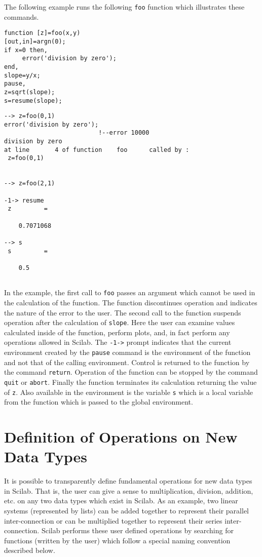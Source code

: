 The following example runs the following {\tt foo} function which
illustrates these commands.
\begin{verbatim}
function [z]=foo(x,y)
[out,in]=argn(0);
if x=0 then,
     error('division by zero');
end,
slope=y/x;
pause,
z=sqrt(slope);
s=resume(slope);
\end{verbatim}
\begin{verbatim} 
--> z=foo(0,1)
error('division by zero');
                          !--error 10000 
division by zero                                                                
at line       4 of function    foo      called by :  
 z=foo(0,1)
 
 
--> z=foo(2,1)
 
-1-> resume
 z         =
 
    0.7071068  
 
--> s
 s         =
 
    0.5  
 
\end{verbatim}
In the example, the first call to {\tt foo} passes an argument which cannot
be used in the calculation of the function.  The function discontinues
operation and indicates the nature of the error to the user.  The second call
to the function suspends operation after the calculation of {\tt slope}.
Here the user can examine values calculated inside of the function,
perform plots, and, in fact perform any operations 
allowed in Scilab.  The {\tt -1->} prompt indicates that the current
environment created by the {\tt pause} command is the environment 
of the function and not that of the calling environment.  Control is 
returned to the function by the command {\tt return}.  Operation of the
function can be stopped by the command {\tt quit} or {\tt abort}.
Finally the function terminates its calculation returning the
value of {\tt z}.  Also available in the environment is the variable
{\tt s} which is a local variable from the function which is passed to
the global environment.

\section{Definition of Operations on New Data Types}
\label{s4.3}

	It is possible to transparently define fundamental operations 
for new data types in Scilab.
That is, the user can give a sense to multiplication, division, addition, etc.
on any two data types which exist in Scilab.  As an example, two linear
systems (represented by lists)
can be added together to represent their parallel inter-connection
or can be multiplied together to represent their series inter-connection.
Scilab performs these user defined operations by searching for functions
(written by the user) which follow a special naming convention described
below.

